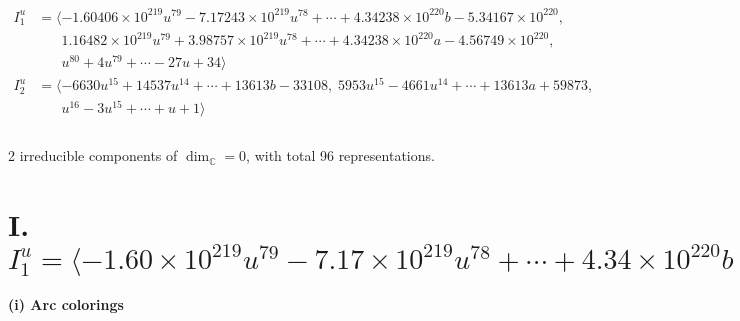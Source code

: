 \documentclass[1p]{elsarticle_modified}
\theoremstyle{definition}
\begin{document}
\begin{align*}
I^u_{1}&=\langle 
-1.60406\times10^{219} u^{79}-7.17243\times10^{219} u^{78}+\cdots+4.34238\times10^{220} b-5.34167\times10^{220},\\
\phantom{I^u_{1}}&\phantom{= \langle  }1.16482\times10^{219} u^{79}+3.98757\times10^{219} u^{78}+\cdots+4.34238\times10^{220} a-4.56749\times10^{220},\\
\phantom{I^u_{1}}&\phantom{= \langle  }u^{80}+4 u^{79}+\cdots-27 u+34\rangle \\
I^u_{2}&=\langle 
-6630 u^{15}+14537 u^{14}+\cdots+13613 b-33108,\;5953 u^{15}-4661 u^{14}+\cdots+13613 a+59873,\\
\phantom{I^u_{2}}&\phantom{= \langle  }u^{16}-3 u^{15}+\cdots+u+1\rangle \\
\\
\end{align*}
\raggedright * 2 irreducible components of $\dim_{\mathbb{C}}=0$, with total 96 representations.\\
\newpage
\renewcommand{\arraystretch}{1}
\centering \section*{I. $I^u_{1}= \langle -1.60\times10^{219} u^{79}-7.17\times10^{219} u^{78}+\cdots+4.34\times10^{220} b-5.34\times10^{220},\;1.16\times10^{219} u^{79}+3.99\times10^{219} u^{78}+\cdots+4.34\times10^{220} a-4.57\times10^{220},\;u^{80}+4 u^{79}+\cdots-27 u+34 \rangle$}
\flushleft \textbf{(i) Arc colorings}\\
\end{document}
